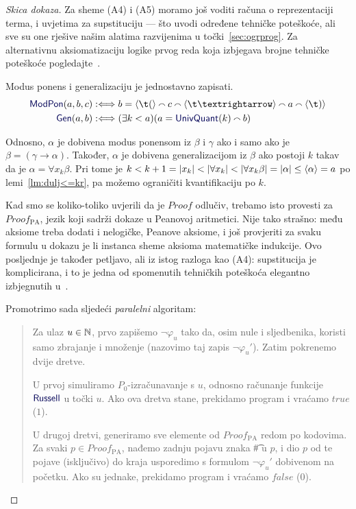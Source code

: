 \begin{proof}[Skica dokaza]
	Za sheme (A4) i (A5) moramo još voditi računa o reprezentaciji terma, i uvjetima za supstituciju --- što uvodi određene tehničke poteškoće, ali sve su one rješive našim alatima razvijenima u točki~\ref{sec:ogrprog}. Za alternativnu aksiomatizaciju logike prvog reda koja izbjegava brojne tehničke poteškoće pogledajte~\cite{smullyan}.

Modus ponens i generalizaciju je jednostavno zapisati.
\begin{align}
    \f{ModPon}(a,b,c)&:\Longleftrightarrow b=
    \kr{\t(}\conc{}
    c\conc{}
    \kr{\t\textrightarrow}\conc{}
    a\conc{}\kr{\t)}\\
    \f{Gen}(a,b)&:\Longleftrightarrow
    (\exists k<a)(a=\f{UnivQuant}(k)\conc{}b)
\end{align}

	Odnosno, $\alpha$ je dobivena modus ponensom iz $\beta$ i $\gamma$ ako i samo ako je $\beta=(\gamma\to\alpha)$. Također, $\alpha$ je dobivena generalizacijom iz $\beta$ ako postoji $k$ takav da je $\alpha=\forall x_k\beta$. Pri tome je $k<k+1=\lvert x_k\rvert<\lvert\forall x_k\rvert<\lvert\forall x_k\beta\rvert=\lvert\alpha\rvert\le\langle\alpha\rangle=a$ po lemi~\ref{lm:dulj<=kr}, pa možemo ograničiti kvantifikaciju po $k$.

    Kad smo se koliko-toliko uvjerili da je $Proof$ odlučiv\!, trebamo isto provesti za $Proof_{\text{PA}}$, jezik koji sadrži dokaze u Peanovoj aritmetici. Nije tako strašno: među aksiome treba dodati i nelogičke, Peanove aksiome, i još provjeriti za svaku formulu u dokazu je li instanca sheme aksioma matematičke indukcije. Ovo posljednje je također petljavo, ali iz istog razloga kao (A4): supstitucija je komplicirana, i to je jedna od spomenutih tehničkih poteškoća elegantno izbjegnutih u~\cite{smullyan}.

Promotrimo sada sljedeći \emph{paralelni} algoritam:
\begin{quote}
    Za ulaz $u\in{\mathbb N}$, prvo zapišemo $\neg\varphi_u$ tako da, osim nule i sljedbenika, koristi samo zbrajanje i množenje (nazovimo taj zapis $\neg\varphi_u'$). Zatim pokrenemo dvije dretve.

    U prvoj simuliramo $P_0$-izračunavanje s $u$, odnosno računanje funkcije $\f{Russell}$ u točki $u$. Ako ova dretva stane, prekidamo program i vraćamo $\mathit{true}$ ($1$).

    U drugoj dretvi, generiramo sve elemente od $Proof_{\text{PA}}$ redom po kodovima. Za svaki $p\in Proof_{\text{PA}}$, nađemo zadnju pojavu znaka \t\# u $p$, i dio $p$ od te pojave (isključivo) do kraja usporedimo s formulom $\neg\varphi_u'$ dobivenom na početku. Ako su jednake, prekidamo program i vraćamo $\mathit{false}$ ($0$).
\end{quote}


\end{proof}
